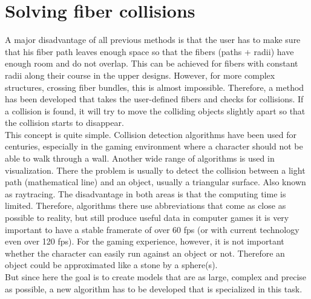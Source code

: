 \section{Solving fiber collisions}
\label{sec:Solver}
% 
A major disadvantage of all previous methods is that the user has to make sure that his fiber path leaves enough space so that the fibers (paths + radii) have enough room and do not overlap.
This can be achieved for fibers with constant radii along their course in the upper designs.
However, for more complex structures, \eg{} crossing fiber bundles, this is almost impossible.
Therefore, a method has been developed that takes the user-defined fibers and checks for collisions.
If a collision is found, it will try to move the colliding objects slightly apart so that the collision starts to disappear.
\\
% 
This concept is quite simple.
Collision detection algorithms have been used for centuries, especially in the gaming environment where \eg{} a character should not be able to walk through a wall.
Another wide range of algorithms is used in visualization.
There the problem is usually to detect the collision between a light path (mathematical line) and an object, usually a triangular surface.
Also known as raytracing.
The disadvantage in both areas is that the computing time is limited.
Therefore, algorithms there use abbreviations that come as close as possible to reality, but still produce useful data \eg{} in computer games it is very important to have a stable framerate of over 60 \ac{fps} (or with current technology even over 120 \ac{fps}).
For the gaming experience, however, it is not important whether the character can easily run against an object or not.
Therefore an object could be approximated like a stone by a sphere(s).
\\
%
But since here the goal is to create models that are as large, complex and precise as possible, a new algorithm has to be developed that is specialized in this task.
% 
\\[\baselineskip]
%

